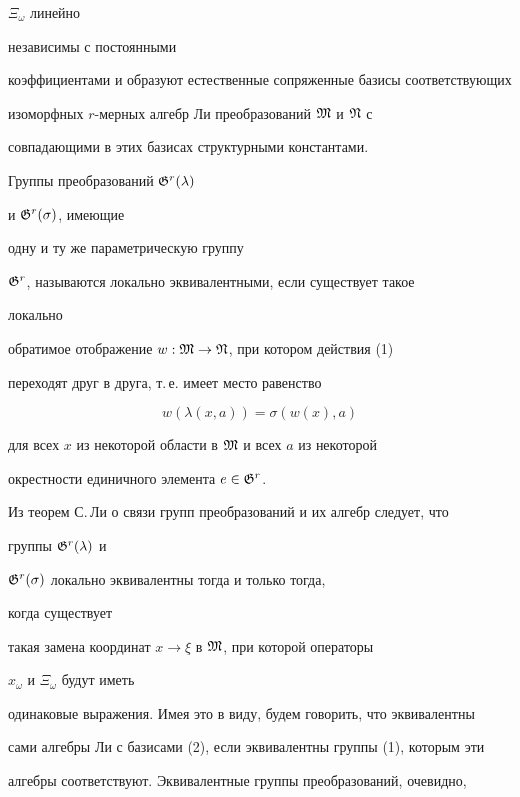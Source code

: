 $\Xi_\omega$ линейно 


независимы с постоянными 


коэффициентами и образуют естественные сопряженные базисы соответствующих 


изоморфных $r$-мерных алгебр Ли преобразований $\frak M$ и $\frak N$ с 


совпадающими в этих базисах структурными константами. 


 


\begin{defnnonum} Группы преобразований $\frak G^r(\lambda)$ 


и $\frak G^r(\sigma)$, имеющие 


одну и ту же параметрическую группу 


$\frak G^r$, называются локально эквивалентными, если существует такое 


локально 


обратимое отображение $w:\frak M\to\frak N$, при котором действия (1) 


переходят друг в друга, т.\,е. имеет место равенство


$$ 


w(\lambda(x,a))=\sigma(w(x),a) 


$$ 


для всех $x$ из некоторой области в $\frak M$ и всех $a$ из некоторой 


окрестности единичного элемента $e\in\frak G^r$. 


\end{defnnonum} 


 


Из теорем С.\,Ли о связи групп преобразований и их алгебр следует, что 


группы $\frak G^r(\lambda)$ и 


$\frak G^r(\sigma)$ локально эквивалентны тогда и только тогда, 


когда существует 


такая замена координат $x\to\xi$ в $\frak M$, при которой операторы 


$x_\omega$ и $\Xi_\omega$ будут иметь 


одинаковые выражения. Имея это в виду, будем говорить, что эквивалентны 


сами алгебры Ли с базисами (2), если эквивалентны группы (1), которым эти 


алгебры соответствуют. Эквивалентные группы преобразований, очевидно, 


